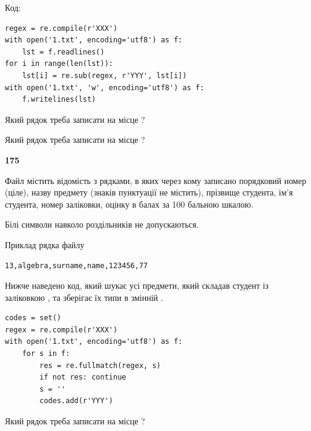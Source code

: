 Код:



\begin{verbatim}
regex = re.compile(r'XXX')
with open('1.txt', encoding='utf8') as f:
    lst = f.readlines()
for i in range(len(lst)):
    lst[i] = re.sub(regex, r'YYY', lst[i])
with open('1.txt', 'w', encoding='utf8') as f:
    f.writelines(lst)
\end{verbatim}







Який рядок треба записати на місце  ?\par
\vspace{5mm}


Який рядок треба записати на місце  ?\par


\newpage

{\begin {center}\textbf{ 175}\end {center}}\par
Файл  містить відомість з рядками, в яких через кому записано поряд\-ковий номер (ціле), назву предмету (знаків пунктуації не містить), прізвище студента, ім'я студента, номер заліковки, оцінку в балах за 100 бальною шкалою.

Білі символи навколо роздільників не допускаються.

Приклад рядка файлу



\begin{verbatim}
13,algebra,surname,name,123456,77
\end{verbatim}


Нижче наведено код, який шукає усі предмети, який складав студент із заліковкою , та зберігає їх типи в змінній .



\begin{verbatim}
codes = set()
regex = re.compile(r'XXX')
with open('1.txt', encoding='utf8') as f:
    for s in f:
        res = re.fullmatch(regex, s)
        if not res: continue
        s = ''
        codes.add(r'YYY')
\end{verbatim}





Який рядок треба записати на місце  ?\par
\vspace{5mm}



